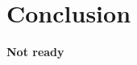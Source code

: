 \documentclass[10pt,twoside,slovak,a4paper]{article}
\begin{document}
\section{Conclusion} \label{Conclusion}
\textbf{Not ready}





\end{document}

